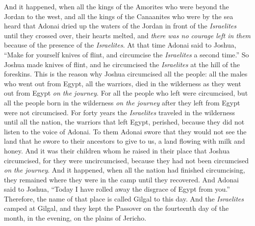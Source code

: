 \begin{biblechapter} %
 And it happened, when all the kings of the Amorites who were beyond the Jordan to the west, and all the kings of the Canaanites who were by the sea heard that Adonai dried up the waters of the Jordan in front of the \textit{Israelites} until they crossed over, their hearts melted, and \textit{there was no courage left in them} because of the presence of the \textit{Israelites}. 
\verse At that time Adonai said to Joshua, “Make for yourself knives of flint, and circumcise the \textit{Israelites} a second time.”
\verse So Joshua made knives of flint, and he circumcised the \textit{Israelites} at the hill of the foreskins.
\verse This is the reason why Joshua circumcised all the people: all the males who went out from Egypt, all the warriors, died in the wilderness as they went out from Egypt \textit{on the journey}.
\verse For all the people who left were circumcised, but all the people born in the wilderness \textit{on the journey} after they left from Egypt were not circumcised.
\verse For forty years the \textit{Israelites} traveled in the wilderness until all the nation, the warriors that left Egypt, perished, because they did not listen to the voice of Adonai. To them Adonai swore that they would not see the land that he swore to their ancestors to give to us, a land flowing with milk and honey.
\verse And it was their children whom he raised in their place that Joshua circumcised, for they were uncircumcised, because they had not been circumcised \textit{on the journey}.
 And it happened, when all the nation had finished circumcising, they remained where they were in the camp until they recovered.
\verse And Adonai said to Joshua, “Today I have rolled away the disgrace of Egypt from you.” Therefore, the name of that place is called Gilgal to this day.
\verse And the \textit{Israelites} camped at Gilgal, and they kept the Passover on the fourteenth day of the month, in the evening, on the plains of Jericho.

\end{biblechapter}
